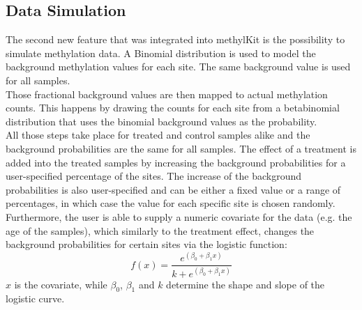 \subsection{Data Simulation}

The second new feature that was integrated into methylKit is the possibility to simulate methylation data. A Binomial distribution is used to model the background methylation values for each site. The same background value is used for all samples.\\
Those fractional background values are then mapped to actual methylation counts. This happens by drawing the counts for each site from a betabinomial distribution that uses the binomial background values as the probability.\\
All those steps take place for treated and control samples alike and the background probabilities are the same for all samples.
The effect of a treatment is added into the treated samples by increasing the background probabilities for a user-specified percentage of the sites. The increase of the background probabilities is also user-specified and can be either a fixed value or a range of percentages, in which case the value for each specific site is chosen randomly.\\
Furthermore, the user is able to supply a numeric covariate for the data (e.g. the age of the samples), which similarly to the treatment effect, changes the background probabilities for certain sites via the logistic function:
\[f(x) = \frac{e^{(\beta_{0} + \beta_{1}x)}}{k+e^{(\beta_{0} + \beta_{1}x)}}\]
$x$ is the covariate, while $\beta_{0}$, $\beta_{1}$ and $k$ determine the shape and slope of the logistic curve.
  
  
  
  
  
  
  
  
  
  
  
  
  
  
